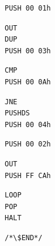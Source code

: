 \documentclass{scrartcl}
\begin{document}
            \begin{lstlisting}[firstnumber = 33]
PUSH 00 01h
            \end{lstlisting}
            \begin{lstlisting}[firstnumber = 36]
OUT
DUP
PUSH 00 03h
            \end{lstlisting}
            \begin{lstlisting}[firstnumber = 41]
CMP
PUSH 00 0Ah
            \end{lstlisting}
            \begin{lstlisting}[firstnumber = 45]
JNE
PUSHDS
PUSH 00 04h
            \end{lstlisting}
            \begin{lstlisting}[firstnumber = 50]
PUSH 00 02h
            \end{lstlisting}
            \begin{lstlisting}[firstnumber = 53]
OUT
PUSH FF CAh
            \end{lstlisting}
            \begin{lstlisting}[firstnumber = 57]
LOOP
POP
HALT
        \end{lstlisting}
        \lstset{belowskip = 0.0mm, numbers = none}
        \begin{lstlisting}
/*\$END*/
        \end{lstlisting}
    
\end{document}
